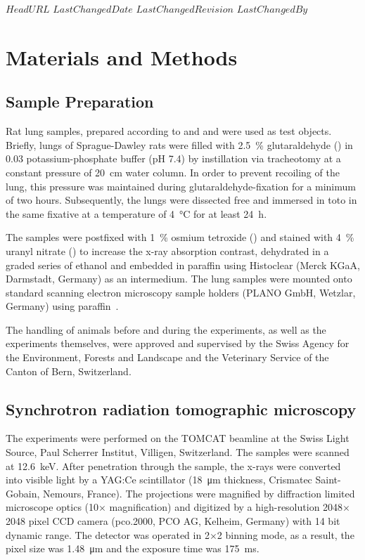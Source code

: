 \svnidlong
{$HeadURL$}
{$LastChangedDate$}
{$LastChangedRevision$}
{$LastChangedBy$}
%
\section{Materials and Methods}
\label{sec:materials and methods}
\subsection{Sample Preparation}
Rat lung samples, prepared according to
\ifhtml
	\citet{Tschanz2002} and \citet{Luyet2002}
\else
	 and 
\fi
were used as test objects. Briefly, lungs of Sprague-Dawley rats were filled with \SI{2.5}{\percent} glutaraldehyde () in \SI{0.03}{\Molar} potassium-phosphate buffer (pH 7.4) by instillation via tracheotomy at a constant pressure of \SI{20}{\centi\meter} water column. In order to prevent recoiling of the lung, this pressure was maintained during glutaraldehyde-fixation for a minimum of two hours. Subsequently, the lungs were dissected free and immersed in toto in the same fixative at a temperature of \SI{4}{\celsius} for at least \SI{24}{\hour}.

The samples were postfixed with \SI{1}{\percent} osmium tetroxide () and stained with \SI{4}{\percent} uranyl nitrate () to increase the x-ray absorption contrast, dehydrated in a graded series of ethanol and embedded in paraffin using Histoclear (Merck KGaA, Darmstadt, Germany) as an intermedium. The lung samples were mounted onto standard scanning electron microscopy sample holders (PLANO GmbH, Wetzlar, Germany) using paraffin~\cite{Tsuda2008}.

The handling of animals before and during the experiments, as well as the experiments themselves, were approved and supervised by the Swiss Agency for the Environment, Forests and Landscape and the Veterinary Service of the Canton of Bern, Switzerland.

\subsection{Synchrotron radiation tomographic microscopy}
The experiments were performed on the TOMCAT beamline at the Swiss Light Source, Paul Scherrer Institut, Villigen, Switzerland. The samples were scanned at \SI{12.6}{\kilo\electronvolt}. After penetration through the sample, the x-rays were converted into visible light by a YAG:Ce scintillator (\SI{18}{\micro\meter} thickness, Crismatec Saint-Gobain, Nemours, France). The projections were magnified by diffraction limited microscope optics (10$\times$ magnification) and digitized by a high-resolution 2048$\times$2048 pixel CCD camera (pco.2000, PCO AG, Kelheim, Germany) with 14 bit dynamic range. The detector was operated in 2$\times$2 binning mode, as a result, the pixel size was \SI{1.48}{\micro\meter} and the exposure time was \SI{175}{\milli\second}.

